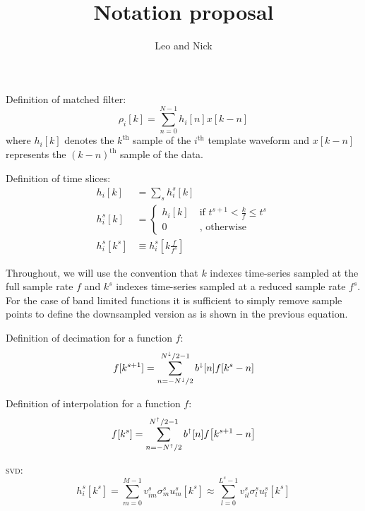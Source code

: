 \documentclass[letterpaper,11pt]{article}
\title{Notation proposal}
\author{Leo and Nick}
\begin{document}
\maketitle

Definition of matched filter:
\begin{equation}
\rho_i [k] = \sum_{n=0}^{N-1} h_{i}[n] x [k-n]
\end{equation}
where $h_i[k]$ denotes the $k^{\mathrm{th}}$ sample of the $i^{\mathrm{th}}$
template waveform and $x[k-n]$ represents the $(k-n)^{\mathrm{th}}$ sample of
the data.

Definition of time slices:
\begin{align}
h_{i}[k] &= \sum_s h_{i}^{s}[k] \\
h_{i}^{s}[k] &= \left\{ \begin{aligned}
    h_{i}[k] & \; \text{if } t^{s+1} < \frac{k}{f} \leq t^{s} \\
    0 & \; \text{, otherwise }
    \end{aligned} \right. \\
h_{i}^{s}[k^{s}] &\equiv h_{i}^{s}\!\left[k\frac{f}{f^{s}}\right]
\end{align}

Throughout, we will use the convention that $k$ indexes time-series sampled at
the full sample rate $f$ and $k^s$ indexes time-series sampled at a reduced
sample rate $f^s$.  For the case of band limited functions it is sufficient to
simply remove sample points to define the downsampled version as is shown in
the previous equation.  

Definition of decimation for a function $f$:
\begin{equation}
f[k^{s+1}] = \sum_{n=-N^\shortdownarrow/2}^{N^\shortdownarrow/2-1} b^\shortdownarrow[n] f\!\left[k^{s} - n\right]
\end{equation}

Definition of interpolation for a function $f$:
\begin{equation}
f[k^{s}] = \sum_{n=-N^\shortuparrow/2}^{N^\shortuparrow/2-1} b^\shortuparrow[n] f\!\left[k^{s+1} - n\right]
\end{equation}

\textsc{svd}:
\begin{equation}
h^{s}_{i}\!\left[k^{s}\right] = \sum_{m=0}^{M-1} v^{s}_{im} \sigma^{s}_m u^{s}_{m}[k^{s}] \approx \sum_{l=0}^{L^s-1} v^{s}_{il} \sigma^{s}_l u^{s}_{l}[k^{s}]
\end{equation}
\end{document}
